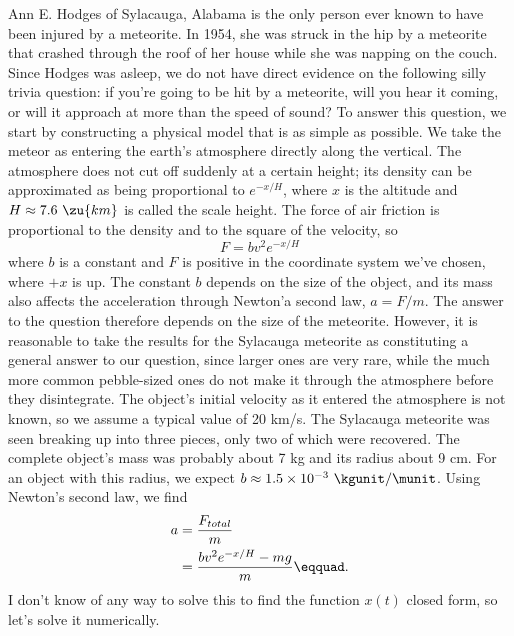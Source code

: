 \begin{listing}{1}
\begin{listing}{1}
Ann E. Hodges of Sylacauga, Alabama is the only person ever known to have been injured by a meteorite. In 1954, she was struck
in the hip by a meteorite that crashed through the roof of her house while she
was napping on the couch. Since Hodges was asleep, we do not have direct evidence on the following silly trivia
question: if you're going to be hit by a meteorite, will you hear it coming, or will it approach at more
than the speed of sound? To answer this question, we start by constructing a physical model that is as simple
as possible. We take the meteor as entering the earth's atmosphere directly along the vertical. The atmosphere does
not cut off suddenly at a certain height; its density can be approximated as being proportional to $e^{-x/H}$,
where $x$ is the altitude and $H\approx 7.6\ \zu{km}$ is called the scale height.
The force of air friction is proportional to the density and to the square of the velocity, so
\begin{equation*}
  F = bv^2e^{-x/H}
\end{equation*}
where $b$ is a constant and $F$ is positive in the coordinate system we've chosen, where $+x$ is up.
The constant $b$ depends on the size of the object, and its mass also affects the acceleration through
Newton'a second law, $a=F/m$. The answer to the question therefore depends on the size of the meteorite.
However, it is reasonable to take the results for the Sylacauga meteorite as constituting a general answer
to our question, since larger ones are very rare, while the much more common pebble-sized ones
do not make it through the atmosphere before they disintegrate.
The object's initial velocity as it entered the atmosphere is not known, so we assume a typical
value of 20 km/s.
The Sylacauga meteorite was seen breaking up into three pieces, only two of which were recovered.
The complete object's mass was probably about 7 kg and its radius about 9 cm.
For an object with this radius, we expect $b\approx 1.5\times10^{-3}\ \kgunit/\munit$.
Using Newton's second law, we find
\begin{align*}
  a &= \frac{F_{total}}{m} \\
    &= \frac{bv^2e^{-x/H}-mg}{m}\eqquad.
\end{align*}
I don't know of any way to solve this to find the function $x(t)$ closed form, so let's solve it numerically.


\end{listing}
\end{listing}
